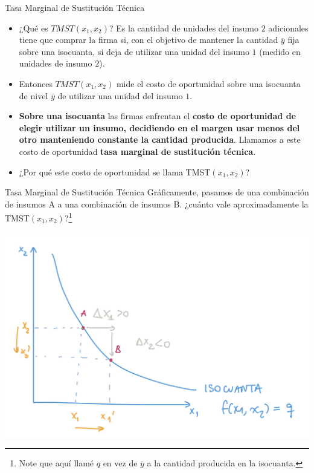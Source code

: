 \documentclass{beamer}
\theoremstyle{definition}
\begin{document}
\begin{frame}{Tasa Marginal de Sustitución Técnica}
	\begin{itemize}
\item ¿Qué es $TMST(x_1,x_2)$? Es la cantidad de unidades del insumo $2$ adicionales tiene que comprar la firma si, con el objetivo de mantener la cantidad $\overline{y}$ fija sobre una isocuanta, si deja de utilizar una unidad del insumo $1$ (medido en unidades de insumo $2$). 

\item Entonces $TMST(x_1,x_2)$ mide el costo de oportunidad sobre una isocuanta de nivel $\overline{y}$ de utilizar una unidad del insumo $1$.
\item \textbf{Sobre una isocuanta} las firmas enfrentan el \textbf{costo de oportunidad de elegir utilizar un insumo, decidiendo en el margen usar menos del otro manteniendo constante la cantidad producida}. Llamamos a este costo de oportunidad \textbf{tasa marginal de sustitución técnica}.
\item ¿Por qué este costo de oportunidad se llama TMST$(x_1,x_2)$?
	\end{itemize}	
\end{frame}		

 \begin{frame}{Tasa Marginal de Sustitución Técnica}
 Gráficamente, pasamos de una combinación de insumos \color{rosee} A \color{black} a una combinación de insumos \color{rosee} B\color{black}. ¿cuánto vale aproximadamente la TMST$(x_1,x_2)$?\footnote{Note que aquí llamé $q$ en vez de $\overline{y}$ a la cantidad producida en la isocuanta.}
 
 \begin{center}
     \includegraphics[scale=0.15]{figures2/TMST.jpeg}
 \end{center}
 \end{frame}
\end{document}
